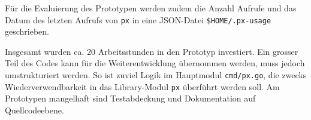 Für die Evaluierung des Prototypen werden zudem die Anzahl Aufrufe und das Datum des letzten Aufrufs von \texttt{px} in eine JSON-Datei \texttt{\$HOME/.px-usage} geschrieben.

Insgesamt wurden ca. 20 Arbeitsstunden in den Prototyp investiert. Ein grosser Teil des Codes kann für die Weiterentwicklung übernommen werden, muss jedoch umstrukturiert werden. So ist zuviel Logik im Hauptmodul \texttt{cmd/px.go}, die zwecks Wiederverwendbarkeit in das Library-Modul \texttt{px} überführt werden soll. Am Prototypen mangelhaft sind Testabdeckung und Dokumentation auf Quellcodeebene.

